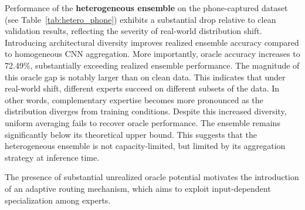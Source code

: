 
Performance of the \textbf{heterogeneous ensemble} on the phone-captured dataset (see Table~\ref{tab:hetero_phone}) exhibits a substantial drop relative to clean validation results, reflecting the severity of real-world distribution shift.
Introducing architectural diversity improves realized ensemble accuracy compared to homogeneous CNN aggregation.
More importantly, oracle accuracy increases to 72.49\%, substantially exceeding realized ensemble performance.
The magnitude of this oracle gap is notably larger than on clean data.
This indicates that under real-world shift, different experts succeed on different subsets of the data.
In other words, complementary expertise becomes more pronounced as the distribution diverges from training conditions.
Despite this increased diversity, uniform averaging fails to recover oracle performance.
The ensemble remains significantly below its theoretical upper bound.
This suggests that the heterogeneous ensemble is not capacity-limited, but limited by its aggregation strategy at inference time.

The presence of substantial unrealized oracle potential motivates the introduction of an adaptive routing mechanism, which aims to exploit input-dependent specialization among experts.
